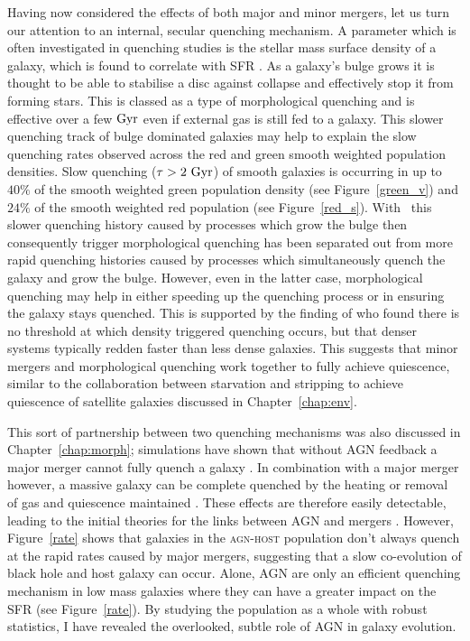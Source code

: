 Having now considered the effects of both major and minor mergers, let us turn our attention to an internal, secular quenching mechanism. A parameter which is often investigated in quenching studies is the stellar mass surface density of a galaxy, which is found to correlate with SFR \citep{barro13b, whitaker16}. As a galaxy's bulge grows it is thought to be able to stabilise a disc against collapse and effectively stop it from forming stars. This is classed as a type of morphological quenching and is effective over a few $\rm{Gyr}$ \citep{Fang13} even if external gas is still fed to a galaxy. This slower quenching track of bulge dominated galaxies may help to explain the slow quenching rates observed across the red and green smooth weighted population densities. Slow quenching ($\tau>2~\rm{Gyr}$) of smooth galaxies is occurring in up to $40\%$ of the smooth weighted green population density (see Figure~\ref{green_v}) and $24\%$ of the smooth weighted red population (see Figure~\ref{red_s}). With \starpy\ this slower quenching history caused by processes which grow the bulge then consequently trigger morphological quenching has been separated out from more rapid quenching histories caused by processes which simultaneously quench the galaxy and grow the bulge. However, even in the latter case, morphological quenching may help in either speeding up the quenching process or in ensuring the galaxy stays quenched. This is supported by the finding of \cite{abramson16} who found there is no threshold at which density triggered quenching occurs, but that denser systems typically redden faster than less dense galaxies. This suggests that minor mergers and morphological quenching work together to fully achieve quiescence, similar to the collaboration between starvation and stripping to achieve quiescence of satellite galaxies discussed in Chapter~\ref{chap:env}. 

This sort of partnership between two quenching mechanisms was also discussed in Chapter~\ref{chap:morph}; simulations have shown that without AGN feedback a major merger cannot fully quench a galaxy \citep{springel05b}. In combination with a major merger however, a massive galaxy can be complete quenched by the heating or removal of gas and quiescence maintained \citep{conselice03, springel05b, hopkins08a, pontzen16}. These effects are therefore easily detectable, leading to the initial theories for the links between AGN and mergers \citep{merritt01, hopkins06b, hopkins08a, hopkins08b, peng07, jahnke11}. However, Figure~\ref{rate} shows that galaxies in the \textsc{agn-host} population don't always quench at the rapid rates caused by major mergers, suggesting that a slow co-evolution of black hole and host galaxy can occur. Alone, AGN are only an efficient quenching mechanism in low mass galaxies where they can have a greater impact on the SFR (see Figure~\ref{rate}). By studying the population as a whole with robust statistics, I have revealed the overlooked, subtle role of AGN in galaxy evolution. 

